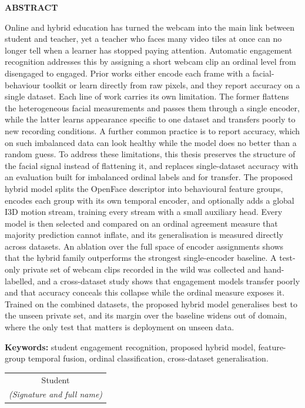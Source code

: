 \documentclass[../main.tex]{subfiles}
\begin{document}
\begin{center}
    \Large{\textbf{ABSTRACT}}\\
\end{center}
\vspace{1cm}

Online and hybrid education has turned the webcam into the main link between student and teacher, yet a teacher who faces many video tiles at once can no longer tell when a learner has stopped paying attention. Automatic engagement recognition addresses this by assigning a short webcam clip an ordinal level from disengaged to engaged. Prior works either encode each frame with a facial-behaviour toolkit or learn directly from raw pixels, and they report accuracy on a single dataset. Each line of work carries its own limitation. The former flattens the heterogeneous facial measurements and passes them through a single encoder, while the latter learns appearance specific to one dataset and transfers poorly to new recording conditions. A further common practice is to report accuracy, which on such imbalanced data can look healthy while the model does no better than a random guess. To address these limitations, this thesis preserves the structure of the facial signal instead of flattening it, and replaces single-dataset accuracy with an evaluation built for imbalanced ordinal labels and for transfer.
The proposed hybrid model splits the OpenFace descriptor into behavioural feature groups, encodes each group with its own temporal encoder, and optionally adds a global I3D motion stream, training every stream with a small auxiliary head. Every model is then selected and compared on an ordinal agreement measure that majority prediction cannot inflate, and its generalisation is measured directly across datasets.
An ablation over the full space of encoder assignments shows that the hybrid family outperforms the strongest single-encoder baseline. A test-only private set of webcam clips recorded in the wild was collected and hand-labelled, and a cross-dataset study shows that engagement models transfer poorly and that accuracy conceals this collapse while the ordinal measure exposes it. Trained on the combined datasets, the proposed hybrid model generalises best to the unseen private set, and its margin over the baseline widens out of domain, where the only test that matters is deployment on unseen data.

\vspace{0.5cm}
\noindent\textbf{Keywords:} student engagement recognition, proposed hybrid model, feature-group temporal fusion, ordinal classification, cross-dataset generalisation.

\begin{flushright}
\begin{tabular}{@{}c@{}}
Student\\
\textit{(Signature and full name)}
\end{tabular}
\end{flushright}
\end{document}
